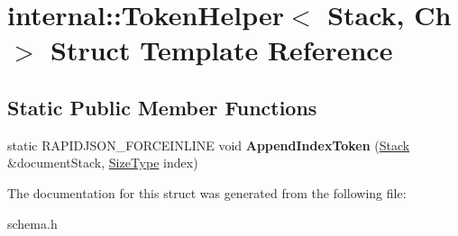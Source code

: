 \hypertarget{a00306}{}\section{internal\+:\+:Token\+Helper$<$ Stack, Ch $>$ Struct Template Reference}
\label{a00306}
\subsection*{Static Public Member Functions}
\begin{DoxyCompactItemize}
\item 
static R\+A\+P\+I\+D\+J\+S\+O\+N\+\_\+\+F\+O\+R\+C\+E\+I\+N\+L\+I\+NE void {\bfseries Append\+Index\+Token} (\hyperlink{a00283}{Stack} \&document\+Stack, \hyperlink{a00677_a5ed6e6e67250fadbd041127e6386dcb5}{Size\+Type} index)\hypertarget{a00306_a7b1864bfe6d4014ba7a5114acb26b3ae}{}\label{a00306_a7b1864bfe6d4014ba7a5114acb26b3ae}

\end{DoxyCompactItemize}


The documentation for this struct was generated from the following file\+:\begin{DoxyCompactItemize}
\item 
schema.\+h\end{DoxyCompactItemize}
